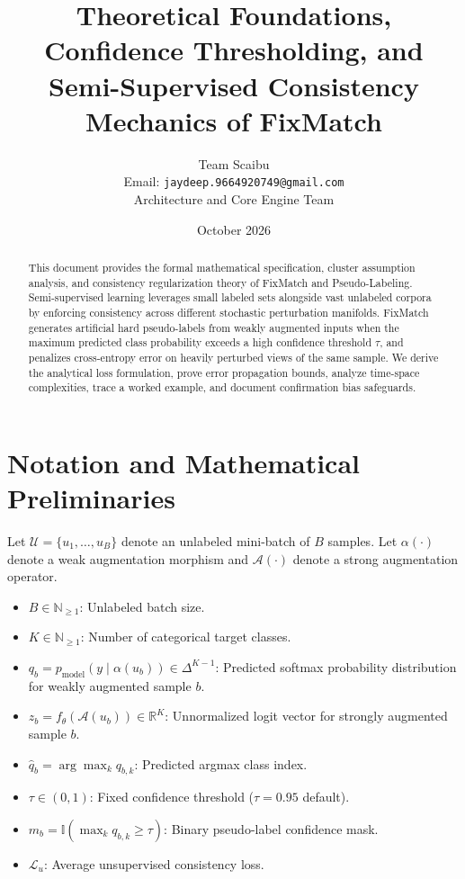 \documentclass[11pt,a4paper]{article}
\title{\textbf{Theoretical Foundations, Confidence Thresholding, and Semi-Supervised Consistency Mechanics of FixMatch}}
\author{Team Scaibu \\ \small Email: \texttt{jaydeep.9664920749@gmail.com} \\ \small Architecture and Core Engine Team}
\date{October 2026}
\theoremstyle{definition}
\begin{document}
\maketitle

\begin{abstract}
This document provides the formal mathematical specification, cluster assumption analysis, and consistency regularization theory of FixMatch and Pseudo-Labeling. Semi-supervised learning leverages small labeled sets alongside vast unlabeled corpora by enforcing consistency across different stochastic perturbation manifolds. FixMatch generates artificial hard pseudo-labels from weakly augmented inputs when the maximum predicted class probability exceeds a high confidence threshold $\tau$, and penalizes cross-entropy error on heavily perturbed views of the same sample. We derive the analytical loss formulation, prove error propagation bounds, analyze time-space complexities, trace a worked example, and document confirmation bias safeguards.
\end{abstract}

\section{Notation and Mathematical Preliminaries}

Let $\mathcal{U} = \{u_1, \dots, u_B\}$ denote an unlabeled mini-batch of $B$ samples. Let $\alpha(\cdot)$ denote a weak augmentation morphism and $\mathcal{A}(\cdot)$ denote a strong augmentation operator.

\begin{itemize}
    \item $B \in \mathbb{N}_{\ge 1}$: Unlabeled batch size.
    \item $K \in \mathbb{N}_{\ge 1}$: Number of categorical target classes.
    \item $q_b = p_{\text{model}}(y \mid \alpha(u_b)) \in \Delta^{K-1}$: Predicted softmax probability distribution for weakly augmented sample $b$.
    \item $z_b = f_\theta(\mathcal{A}(u_b)) \in \mathbb{R}^K$: Unnormalized logit vector for strongly augmented sample $b$.
    \item $\hat{q}_b = \arg\max_k q_{b, k}$: Predicted argmax class index.
    \item $\tau \in (0, 1)$: Fixed confidence threshold ($\tau = 0.95$ default).
    \item $m_b = \mathbb{I}(\max_k q_{b, k} \ge \tau)$: Binary pseudo-label confidence mask.
    \item $\mathcal{L}_u$: Average unsupervised consistency loss.
\end{itemize}
\end{document}
